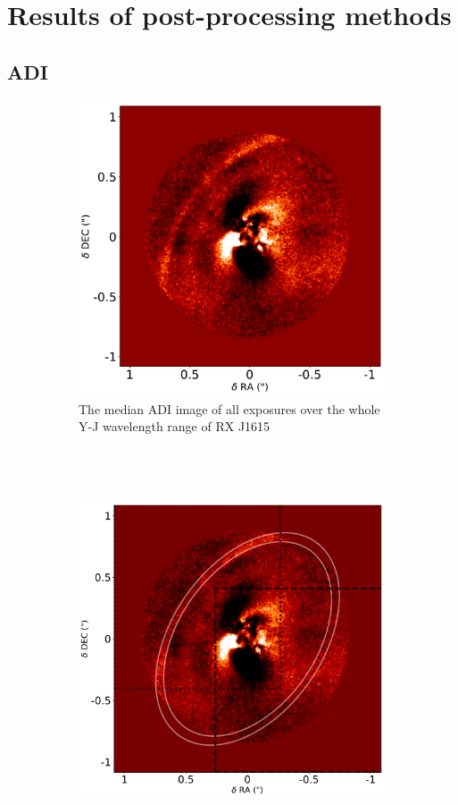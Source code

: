 \documentclass[twoside,single]{lion-msc}
\begin{document}
\chapter{Results of post-processing methods}
\section{ADI}
\begin{figure}[!b]
\centering
\begin{subfigure}{.48\textwidth}
  \centering
  \includegraphics[width=0.8\linewidth]{ADI_tot}
  \caption{The median ADI image of all exposures over the whole Y-J wavelength range of RX J1615\\\\\\\\}
  \label{fig:ADItot}
\end{subfigure}\hfill
\begin{subfigure}{.48\textwidth}
  \centering
  \includegraphics[width=0.8\linewidth]{totapertures}%

\end{subfigure}
\end{figure}
\end{document}
